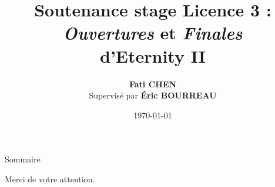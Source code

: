 \documentclass[c, aspectratio=43]{beamer}
\title[\emph{Ouvertures} et \emph{Finales} d'Eternity II]{Soutenance stage Licence 3 : \\ \emph{Ouvertures} et \emph{Finales}\\d'Eternity II}
\author[Fati CHEN]{\textbf{Fati CHEN}\\ Supervisé par \textbf{\'{E}ric BOURREAU}}
\institute{}
\date{\today}
\begin{document}
   

\frame[plain]{\titlepage}


\begin{frame}{Sommaire}
	\tableofcontents[pausesections]
\end{frame}


	




\begin{frame}[plain]
	\centering
	{\Large
		Merci de votre attention.}
\end{frame}
\end{document}
